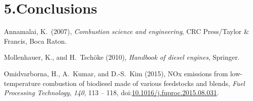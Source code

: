 \documentclass[9pt]{report}
\begin{document}
\section{5.\hspace*{0.5em}Conclusions}\label{sec-conclusions}%

{\mdsupressbiblabel{}\begin{thebibliography}{3}%
\label{sec-bibliography}%

\mdbibitemlabel{}Annamalai, K.~(2007), \emph{Combustion science and engineering}, CRC Press/Taylor \& Francis, Boca Raton.\label{annamalai2007combustion}%

\mdbibitemlabel{}Mollenhauer, K., and H.~Tschöke (2010), \emph{Handbook of diesel engines}, Springer.\label{mollenhauer2010handbook}%

\mdbibitemlabel{}Omidvarborna, H., A.~Kumar, and D.-S.~Kim (2015), NOx emissions from low-temperature combustion of biodiesel made of various feedstocks and blends, \emph{Fuel Processing Technology}, \emph{140}, 113 – 118, doi:\href{https://dx.doi.org/10.1016/j.fuproc.2015.08.031}{10.1016/j.fuproc.2015.08.031}.\label{omidvarborna2015113}%
\par%
\end{thebibliography}}%
\end{document}
